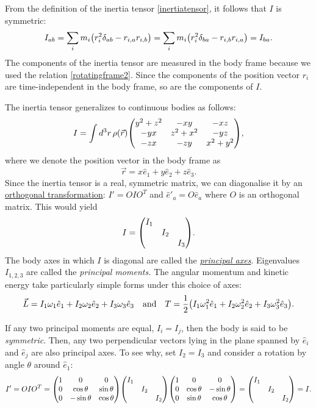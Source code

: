 \documentclass{article}
\begin{document}
From the definition of the inertia tensor \eqref{inertiatensor}, it follows that $I$ is symmetric:
\begin{equation}
    I_{ab} = \sum_i m_i \qty(r_i^2 \delta_{ab} - r_{i,a} r_{i,b}) = \sum_i m_i \qty(r_i^2 \delta_{ba} - r_{i,b} r_{i,a}) = I_{ba}.
\end{equation}
The components of the inertia tensor are measured in the body frame because we used the relation \eqref{rotatingframe2}. Since the components of the position vector $r_i$ are time-independent in the body frame, so are the components of $I$. 
\par
The inertia tensor generalizes to continuous bodies as follows:
\begin{equation} \label{eq:inertiatensor}
    I = \int \dd[3]{r} \rho(\vec{r}) \mqty(y^2+z^2 & -xy & -xz \\ -yx & z^2 + x^2 & -yz \\ -zx & -zy & x^2 + y^2),
\end{equation}
where we denote the position vector in the body frame as
\[
    \vec{r} = x \hat{e}_1 + y \hat{e}_2 + z \hat{e}_3.
\]
Since the inertia tensor is a real, symmetric matrix, we can diagonalise it by an \href{https://en.wikipedia.org/wiki/Orthogonal_transformation}{orthogonal transformation}: $I' = O I O^T$ and $\hat{e}'_a = O \hat{e}_a$ where $O$ is an orthogonal matrix. This would yield
\begin{equation}
    I = \mqty(\dmat{I_1, I_2, I_3}).
\end{equation}
The body axes in which $I$ is diagonal are called the \href{https://en.wikipedia.org/wiki/Moment_of_inertia#Principal_axes}{\textit{principal axes}}. Eigenvalues $I_{1,2,3}$ are called the \textit{principal moments.} The angular momentum and kinetic energy take particularly simple forms under this choice of axes:
\begin{equation}
    \vec{L} = I_1 \omega_1 \hat{e}_1 + I_2 \omega_2 \hat{e}_2 + I_3 \omega_3 \hat{e}_3 \qq{and} T = \frac{1}{2}\qty(I_1 \omega_1^2 \hat{e}_1 + I_2 \omega_2^2 \hat{e}_2 + I_3 \omega_3^2 \hat{e}_3).
\end{equation}
\par
If any two principal moments are equal, $ I_{i} = I_{j} $, then the body is said to be \textit{symmetric}. Then, any two perpendicular vectors lying in the plane spanned by $ \hat{e}_{i} $ and $ \hat{e}_{j} $ are also principal axes. To see why, set $ I_{2} = I_{3} $ and consider a rotation by angle $ \theta $ around $ \hat{e}_{1} $:
\[
	I' = OIO^T = \mqty(1 & 0 & 0 \\ 0 & \cos \theta & \sin \theta \\ 0 & -\sin\theta & \cos \theta)  \mqty(\dmat{I_1, I_2, I_2}) \mqty(1 & 0 & 0 \\ 0 & \cos \theta & -\sin \theta \\ 0 & \sin\theta & \cos \theta) =  \mqty(\dmat{I_1, I_2, I_2}) = I.
\]
\end{document}
